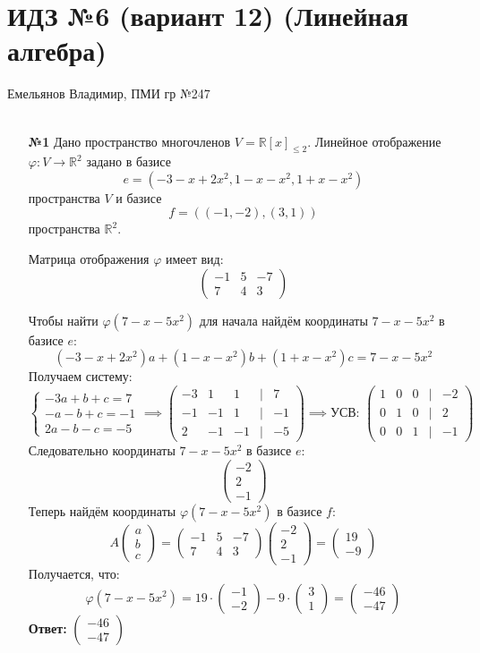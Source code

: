 \documentclass[a4paper]{article}
\newcommand{\mat}[1]{\begin{pmatrix} #1 \end{pmatrix}}
\newcommand{\case}[1]{\begin{cases} #1 \end{cases}}
\renewcommand{\phi}{\varphi}
\begin{document}
\section*{ИДЗ №6 (вариант 12) (Линейная алгебра)}
 {\large Емельянов Владимир, ПМИ гр №247}\\\\
\begin{enumerate}
    \item[\textbf{№1}]Дано пространство многочленов $ V = \mathbb{R}[x]_{\leqslant 2} $. Линейное отображение $ \varphi: V \rightarrow \mathbb{R}^{2} $ задано в базисе 
    $$ e= \left(-3-x+2x^2, 1-x-x^2, 1+x-x^2\right) $$ 
    пространства $ V $ и базисе 
    $$f=  ((-1,-2),(3,1)) $$ 
    пространства $ \mathbb{R}^{2} $. 

    Матрица отображения $ \varphi $ имеет вид:
    $$
    \begin{pmatrix}
    -1 & 5 & -7 \\
    7 & 4 & 3
    \end{pmatrix}
    $$
    
    Чтобы найти $ \varphi\left(7-x-5x^2\right) $ для начала найдём координаты $7-x-5x^2$ в базисе $e$:
    $$(-3-x+2x^2)a+(1-x-x^2)b+(1+x-x^2)c = 7-x-5x^2$$
    Получаем систему:
    $$\case{
        -3a+b+c = 7\\
        -a-b+c=-1\\
        2a-b-c=-5
    } \implies \mat{
        -3 & 1 & 1 & | & 7\\
        -1 & -1 & 1 & | & -1\\
        2 & -1 & -1 & | & -5
    }\implies \text{УСВ: } \mat{1 & 0 & 0 & | & -2 \\
    0 & 1 & 0 & | & 2 \\
    0 & 0 & 1 & | & -1}$$
    Следовательно координаты $7-x-5x^2$ в базисе $e$:
    $$\mat{-2\\2\\-1}$$
    Теперь найдём координаты $\phi\left(7-x-5x^2\right)$ в базисе $f$:
    $$A\mat{a\\b\\c} = \begin{pmatrix}
        -1 & 5 & -7 \\
        7 & 4 & 3
        \end{pmatrix} \mat{-2\\2\\-1} = \mat{19 \\
        -9}$$
    Получается, что:
    $$\varphi\left(7-x-5x^2\right) = 19\cdot \mat{-1\\-2}-9\cdot\mat{3\\1} = \mat{-46\\-47}$$
    \textbf{Ответ: } $\mat{-46\\-47}$\\


\end{enumerate}
\end{document}
